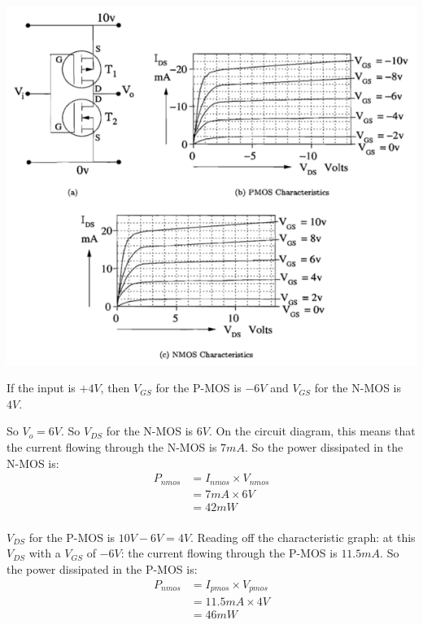 \documentclass[10pt,\jkfside,a4paper]{article}
\begin{document}
\begin{enumerate}
\begin{enumerate}
\begin{center}
\includegraphics{6c}
\end{center}

If the input is $+4V$, then $V_{GS}$ for the P-MOS is $-6V$ and $V_{GS}$ for the 
N-MOS is $4V$.

So $V_o=6V$. So $V_{DS}$ for the N-MOS is $6V$. On the circuit diagram, this means 
that the current flowing through the N-MOS is $7mA$. So the power dissipated in the N-MOS 
is:
\begin{equation}
\begin{split}
P_{nmos}&=I_{nmos}\times V_{nmos}\\
		&=7mA \times 6V\\
		&=42mW\\
\end{split}
\end{equation}

$V_{DS}$ for the P-MOS is $10V - 6V = 4V$.
Reading off the characteristic graph: at this $V_{DS}$ with a $V_{GS}$ of $-6V$: the current 
flowing through the P-MOS is $11.5mA$. So the power dissipated in the P-MOS is:
\begin{equation}
\begin{split}
P_{nmos}&=I_{pmos}\times V_{pmos}\\
		&=11.5mA \times 4V\\
		&=46mW\\
\end{split}
\end{equation}


\end{enumerate}
\end{enumerate}
\end{document}
